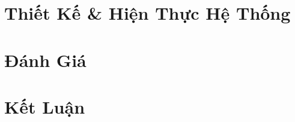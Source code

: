 \documentclass[12pt]{report}
\begin{document}
\chapter{Thiết Kế \& Hiện Thực Hệ Thống}










\chapter{Đánh Giá}









\chapter{Kết Luận}


\printbibliography
% 

% 
% 
\end{document}
